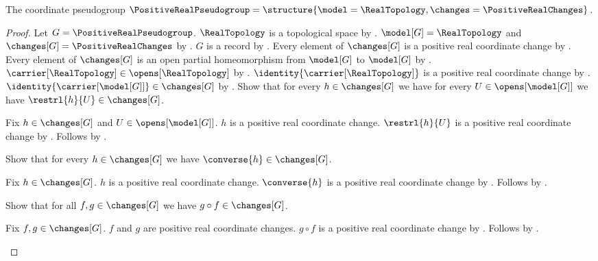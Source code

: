\begin{instance}\label{positive_real_pseudogroup}
    The coordinate pseudogroup $\PositiveRealPseudogroup=
        \structure{\model=\RealTopology,\changes=\PositiveRealChanges}$.
\end{instance}
\begin{proof}
    Let $G=\PositiveRealPseudogroup$.
    $\RealTopology$ is a topological space by .
    $\model[G]=\RealTopology$ and $\changes[G]=\PositiveRealChanges$ by
        .
    $G$ is a record by .
    Every element of $\changes[G]$ is a positive real coordinate change by
        .
    Every element of $\changes[G]$ is an open partial homeomorphism from
        $\model[G]$ to $\model[G]$ by .
    $\carrier[\RealTopology]\in\opens[\RealTopology]$ by .
    $\identity{\carrier[\RealTopology]}$ is a positive real coordinate change by
        .
    $\identity{\carrier[\model[G]]}\in\changes[G]$ by
        .
    Show that for every $h\in\changes[G]$ we have for every $U\in\opens[\model[G]]$
        we have $\restrl{h}{U}\in\changes[G]$.
    \begin{subproof}
        Fix $h\in\changes[G]$ and $U\in\opens[\model[G]]$.
        $h$ is a positive real coordinate change.
        $\restrl{h}{U}$ is a positive real coordinate change by
            .
        Follows by .
    \end{subproof}
    Show that for every $h\in\changes[G]$ we have $\converse{h}\in\changes[G]$.
    \begin{subproof}
        Fix $h\in\changes[G]$.
        $h$ is a positive real coordinate change.
        $\converse{h}$ is a positive real coordinate change by
            .
        Follows by .
    \end{subproof}
    Show that for all $f,g\in\changes[G]$ we have $g\circ f\in\changes[G]$.
    \begin{subproof}
        Fix $f,g\in\changes[G]$.
        $f$ and $g$ are positive real coordinate changes.
        $g\circ f$ is a positive real coordinate change by
            .
        Follows by .

\end{subproof}
\end{proof}
